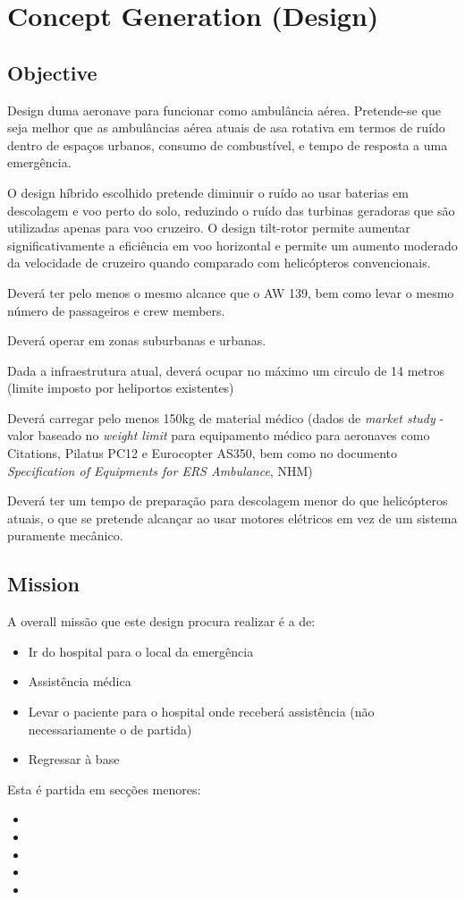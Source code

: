 \section{Concept Generation (Design)}
\subsection{Objective}
Design duma aeronave para funcionar como ambulância aérea. Pretende-se que seja melhor que as ambulâncias aérea atuais de asa rotativa em termos de ruído dentro de espaços urbanos, consumo de combustível, e tempo de resposta a uma emergência.\par
O design híbrido escolhido pretende diminuir o ruído ao usar baterias em descolagem e voo perto do solo, reduzindo o ruído das turbinas geradoras que são utilizadas apenas para voo cruzeiro. O design tilt-rotor permite aumentar significativamente a eficiência em voo horizontal e permite um aumento moderado da velocidade de cruzeiro quando comparado com helicópteros convencionais. \par
Deverá ter pelo menos o mesmo alcance que o AW 139, bem como levar o mesmo número de passageiros e crew members.\par
Deverá operar em zonas suburbanas e urbanas.\par
Dada a infraestrutura atual, deverá ocupar no máximo um circulo de 14 metros (limite imposto por heliportos existentes)\par
Deverá carregar pelo menos 150kg de material médico (dados de \textit{market study} - valor baseado no \textit{weight limit} para equipamento médico para aeronaves como Citations, Pilatus PC12 e Eurocopter AS350, bem como no documento \textit{Specification of Equipments for ERS Ambulance}, NHM) %

Deverá ter um tempo de preparação para descolagem menor do que helicópteros atuais, o que se pretende alcançar ao usar motores elétricos em vez de um sistema puramente mecânico.\par

\subsection{Mission}
A overall missão que este design procura realizar é a de: 
\begin{itemize}
    \item Ir do hospital para o local da emergência
    \item Assistência médica
    \item Levar o paciente para o hospital onde receberá assistência (não necessariamente o de partida)
    \item Regressar à base
\end{itemize}
Esta é partida em secções menores:
\begin{itemize}
    \item 
    \item
    \item
    \item
    \item
\end{itemize}
